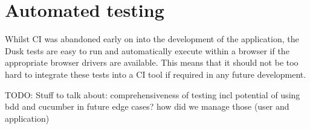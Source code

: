 \section{Automated testing}
Whilst CI was abandoned early on into the development of the application, the Dusk tests are easy to run and automatically execute within a browser if the appropriate browser drivers are available. This means that it should not be too hard to integrate these tests into a CI tool if required in any future development.


TODO: Stuff to talk about:
comprehensiveness of testing incl potential of using bdd and cucumber in future
edge cases? how did we manage those (user and application)